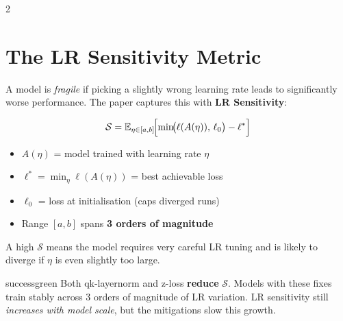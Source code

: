 \documentclass[12pt,a4paper]{article}
\begin{document}
\vspace{8pt}

\begin{multicols}{2}

\section{The LR Sensitivity Metric}

A model is \emph{fragile} if picking a slightly wrong learning rate leads to
significantly worse performance. The paper captures this with \textbf{LR Sensitivity}:

\[
\mathcal{S} = \mathbb{E}_{\eta \in [a,b]}\!\Bigl[\min\!\bigl(\ell(A(\eta)),\, \ell_0\bigr) - \ell^*\Bigr]
\]

\begin{itemize}[leftmargin=14pt, itemsep=2pt]
  \item $A(\eta)$ = model trained with learning rate $\eta$
  \item $\ell^* = \min_\eta \ell(A(\eta))$ = best achievable loss
  \item $\ell_0$ = loss at initialisation (caps diverged runs)
  \item Range $[a,b]$ spans \textbf{3 orders of magnitude}
\end{itemize}

\medskip
A high $\mathcal{S}$ means the model requires very careful LR tuning and is likely
to diverge if $\eta$ is even slightly too large.

\begin{claimbox}{successgreen}
\small
Both qk-layernorm and z-loss \textbf{reduce} $\mathcal{S}$. Models with these fixes
train stably across 3 orders of magnitude of LR variation. LR sensitivity still
\emph{increases with model scale}, but the mitigations slow this growth.
\end{claimbox}

\columnbreak

\begin{center}
\end{center}
\end{multicols}
\end{document}
